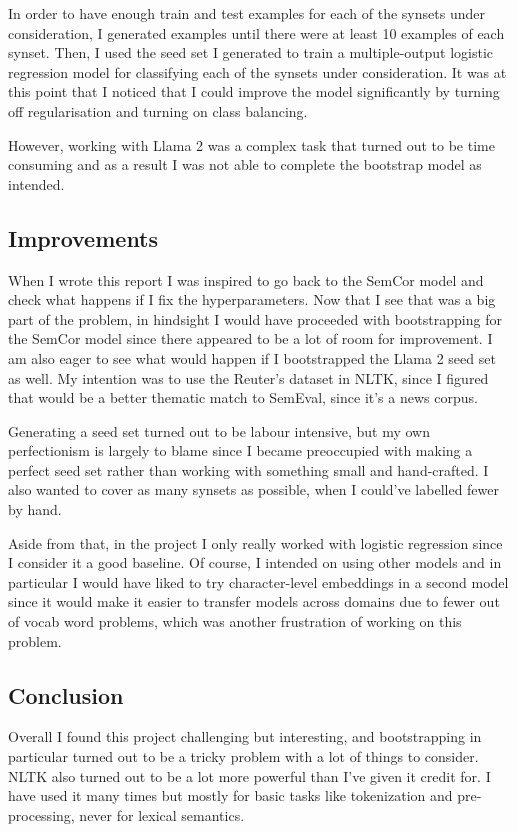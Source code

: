 \documentclass[
10pt, %
a4paper, %
oneside, %
headinclude,footinclude, %
BCOR5mm, %
]{scrartcl}
\begin{document}
In order to have enough train and test examples for each of the synsets under consideration, I generated examples until there were at least 10 examples of each synset. Then, I used the seed set I generated to train a multiple-output logistic regression model for classifying each of the synsets under consideration. It was at this point that I noticed that I could improve the model significantly by turning off regularisation and turning on class balancing.

However, working with Llama 2 was a complex task that turned out to be time consuming and as a result I was not able to complete the bootstrap model as intended.

\subsection{Improvements}

When I wrote this report I was inspired to go back to the SemCor model and check what happens if I fix the hyperparameters. Now that I see that was a big part of the problem, in hindsight I would have proceeded with bootstrapping for the SemCor model since there appeared to be a lot of room for improvement. I am also eager to see what would happen if I bootstrapped the Llama 2 seed set as well. My intention was to use the Reuter's dataset in NLTK, since I figured that would be a better thematic match to SemEval, since it's a news corpus.

Generating a seed set turned out to be labour intensive, but my own perfectionism is largely to blame since I became preoccupied with making a perfect seed set rather than working with something small and hand-crafted. I also wanted to cover as many synsets as possible, when I could've labelled fewer by hand.

Aside from that, in the project I only really worked with logistic regression since I consider it a good baseline. Of course, I intended on using other models and in particular I would have liked to try character-level embeddings in a second model since it would make it easier to transfer models across domains due to fewer out of vocab word problems, which was another frustration of working on this problem.

\subsection{Conclusion}

Overall I found this project challenging but interesting, and bootstrapping in particular turned out to be a tricky problem with a lot of things to consider. NLTK also turned out to be a lot more powerful than I've given it credit for. I have used it many times but mostly for basic tasks like tokenization and pre-processing, never for lexical semantics.
\end{document}
